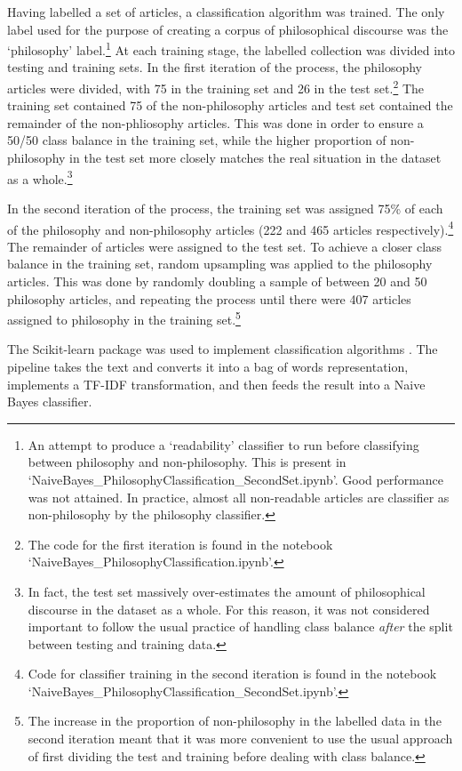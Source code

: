 \documentclass{article}
\begin{document}
Having labelled a set of articles, a classification algorithm was trained. The only label used for the purpose of creating a corpus of philosophical discourse was the `philosophy' label.\footnote{An attempt to produce a `readability' classifier to run before classifying between philosophy and non-philosophy. This is present in `NaiveBayes\_\-PhilosophyClassification\_\-SecondSet.ipynb'. Good performance was not attained. In practice, almost all non-readable articles are classifier as non-philosophy by the philosophy classifier.}
 At each training stage, the labelled collection was divided into testing and training sets. In the first iteration of the process, the philosophy articles were divided, with 75 in the training set and 26 in the test set.\footnote{The code for the first iteration is found in the notebook `NaiveBayes\_\-PhilosophyClassification.ipynb'.}
The training set contained 75 of the non-philosophy articles and test set contained the remainder of the non-phliosophy articles. This was done in order to ensure a 50/50 class balance in the training set, while the higher proportion of non-philosophy in the test set more closely matches the real situation in the dataset as a whole.\footnote{In fact, the test set massively over-estimates the amount of philosophical discourse in the dataset as a whole. For this reason, it was not considered important to follow the usual practice of handling class balance \emph{after} the split between testing and training data.}

In the second iteration of the process, the training set was assigned 75\% of each of the philosophy and non-philosophy articles (222 and 465 articles respectively).\footnote{Code for classifier training in the second iteration is found in the notebook `NaiveBayes\_\-PhilosophyClassification\_\-SecondSet.ipynb'.} The remainder of articles were assigned to the test set. To achieve a closer class balance in the training set, random upsampling was applied to the philosophy articles. This was done by randomly doubling a sample of between 20 and 50 philosophy articles, and repeating the process until there were 407 articles assigned to philosophy in the training set.\footnote{The increase in the proportion of non-philosophy in the labelled data in the second iteration meant that it was more convenient to use the usual approach of first dividing the test and training before dealing with class balance.}

The Scikit-learn package was used to implement classification algorithms \cite{scikit-learn}. The pipeline takes the text and converts it into a bag of words representation, implements a TF-IDF transformation, and then feeds the result into a Naive Bayes classifier.
\end{document}

